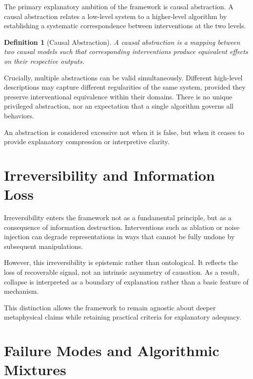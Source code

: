 \documentclass[11pt]{article}
\newtheorem{definition}{Definition}
\begin{document}
The primary explanatory ambition of the framework is causal abstraction. A causal abstraction relates a low-level system to a higher-level algorithm by establishing a systematic correspondence between interventions at the two levels.

\begin{definition}[Causal Abstraction]
A causal abstraction is a mapping between two causal models such that corresponding interventions produce equivalent effects on their respective outputs.
\end{definition}

Crucially, multiple abstractions can be valid simultaneously. Different high-level descriptions may capture different regularities of the same system, provided they preserve interventional equivalence within their domains. There is no unique privileged abstraction, nor an expectation that a single algorithm governs all behaviors.

An abstraction is considered excessive not when it is false, but when it ceases to provide explanatory compression or interpretive clarity.

\section{Irreversibility and Information Loss}

Irreversibility enters the framework not as a fundamental principle, but as a consequence of information destruction. Interventions such as ablation or noise injection can degrade representations in ways that cannot be fully undone by subsequent manipulations.

However, this irreversibility is epistemic rather than ontological. It reflects the loss of recoverable signal, not an intrinsic asymmetry of causation. As a result, collapse is interpreted as a boundary of explanation rather than a basic feature of mechanism.

This distinction allows the framework to remain agnostic about deeper metaphysical claims while retaining practical criteria for explanatory adequacy.

\section{Failure Modes and Algorithmic Mixtures}
\end{document}
